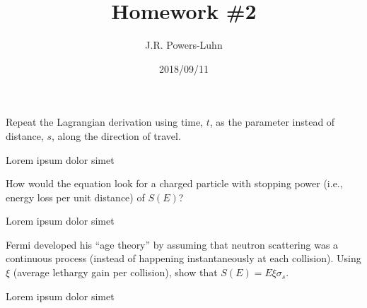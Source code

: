 \documentclass{hw}
\author{J.R. Powers-Luhn}
\date{2018/09/11}
\title{Homework \#2}
\begin{document}
\maketitle

\problem{}
    Repeat the Lagrangian derivation using time, $t$, as the parameter instead of distance, $s$, along the direction of travel.

\solution
    Lorem ipsum dolor simet

\problem{}
    How would the equation look for a charged particle with stopping power (i.e., energy loss per unit distance) of $S(E)$?

\solution
    Lorem ipsum dolor simet

\problem{}
    Fermi developed his “age theory” by assuming that neutron scattering was a continuous process (instead of happening instantaneously at each collision). Using $\xi$ (average lethargy gain per collision), show that $S(E)=E \xi \sigma_s$.

\solution
    Lorem ipsum dolor simet
\end{document}
